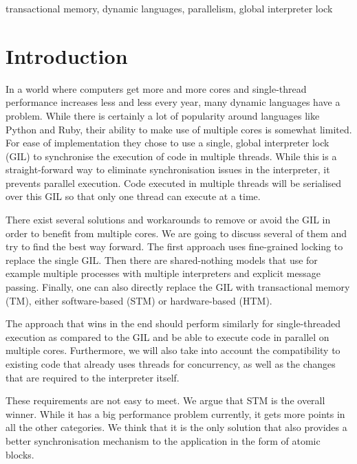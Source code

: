 \documentclass{sigplanconf}
\begin{document}


\keywords
transactional memory, dynamic languages, parallelism, global interpreter lock

\section{Introduction}
In a world where computers get more and more cores and single-thread
performance increases less and less every year, many dynamic languages
have a problem. While there is certainly a lot of popularity around
languages like Python and Ruby, their ability to make use of multiple
cores is somewhat limited. For ease of implementation they chose to
use a single, global interpreter lock (GIL) to synchronise the
execution of code in multiple threads. While this is a
straight-forward way to eliminate synchronisation issues in the
interpreter, it prevents parallel execution. Code executed in multiple
threads will be serialised over this GIL so that only one thread can
execute at a time.

There exist several solutions and workarounds to remove or avoid the
GIL in order to benefit from multiple cores. We are going to discuss
several of them and try to find the best way forward. The first
approach uses fine-grained locking to replace the single GIL. Then
there are shared-nothing models that use for example multiple
processes with multiple interpreters and explicit message
passing. Finally, one can also directly replace the GIL with
transactional memory (TM), either software-based (STM) or
hardware-based (HTM).

The approach that wins in the end should perform similarly for
single-threaded execution as compared to the GIL and be able to
execute code in parallel on multiple cores. Furthermore, we will also
take into account the compatibility to existing code that already uses
threads for concurrency, as well as the changes that are required to
the interpreter itself.

These requirements are not easy to meet. We argue that STM is the
overall winner. While it has a big performance problem currently, it
gets more points in all the other categories. We think that it is the
only solution that also provides a better synchronisation mechanism to
the application in the form of atomic blocks.
\end{document}
